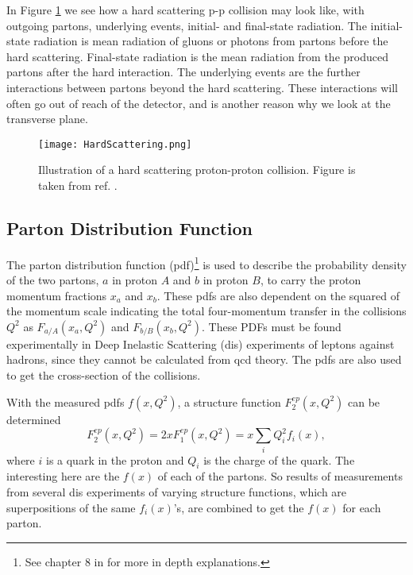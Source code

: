 \documentclass[a4paper, american, 12pt]{report}
\begin{document}
	In Figure \ref{fig:HardScattering} we see how a hard scattering p-p collision may look like, with outgoing partons, underlying events, initial- and final-state radiation. The initial-state radiation is mean radiation of gluons or photons from partons before the hard scattering. Final-state radiation is the mean radiation from the produced partons after the hard interaction. The underlying events are the further interactions between partons beyond the hard scattering. These interactions will often go out of reach of the detector, and is another reason why we look at the transverse plane.
	\begin{figure}[htbp!]
		\hspace*{-0.8cm}
		\centering\texttt{[image: HardScattering.png]}
		\caption[Hard scattering.]{Illustration of a hard scattering proton-proton collision. Figure is taken from ref. \cite{field2002hardscattering}. \label{fig:HardScattering}}
	\end{figure} 
	
	
	\subsection{Parton Distribution Function}
	\label{subsect:Theory-PartonDF}
	The parton distribution function (\acrshort{pdf})\footnote{See chapter 8 in \citet{thomson2013modern} for more in depth explanations.}  is used to describe the probability density of the two partons, $a$ in proton $A$ and $b$ in proton $B$, to carry the proton momentum fractions $x_a$ and $x_b$. These \acrshort{pdf}s are also dependent on the squared of the momentum scale indicating the total four-momentum transfer in the collisions $Q^2$ as $F_{a/A}(x_a,Q^2)$ and $F_{b/B}(x_b,Q^2)$. These PDFs must be found experimentally in Deep Inelastic Scattering (\acrshort{dis}) experiments of leptons against hadrons, since they cannot be calculated from \acrshort{qcd} theory. The \acrshort{pdf}s are also used to get the cross-section of the collisions. 
	
	With the measured \acrshort{pdf}s $f(x,Q^2)$, a structure function $F_2^{ep}(x,Q^2)$ can be determined
	\begin{equation}
	\label{eq:Structure_function}
	F_2^{ep}(x,Q^2)=2xF_1^{ep}(x,Q^2)=x\sum_{i}Q_i^2f_i(x),
	\end{equation}
	where $i$ is a quark in the proton and $Q_i$ is the charge of the quark. The interesting here are the $f(x)$ of each of the partons. So results of measurements from several \acrshort{dis} experiments of varying structure functions, which are superpositions of the same $f_i(x)$'s, are combined to get the $f(x)$ for each parton.
		
\end{document}
